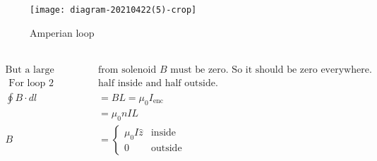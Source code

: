 \begin{minipage}{0.35\textwidth}
	\begin{figure}[H]
		\centering
		\texttt{[image: diagram-20210422(5)-crop]}
		\caption{Amperian loop}
		\label{rc current discharge}
	\end{figure}	
\end{minipage}\\
\begin{align*}
\text{But a large distance }&\text{from solenoid $B$ must be zero. So it should be zero everywhere.}\\
\text{	For loop $2$ }&\text{half inside and half outside.}\\
\oint {B} \cdot d {l}&=B L=\mu_{0} I_{\mathrm{enc}}\\&=\mu_{0} n I L\\
B&= \begin{cases}
\mu_0 I \hat{z}& \text{inside}\\
0    & \text{outside}
\end{cases}
\end{align*}
